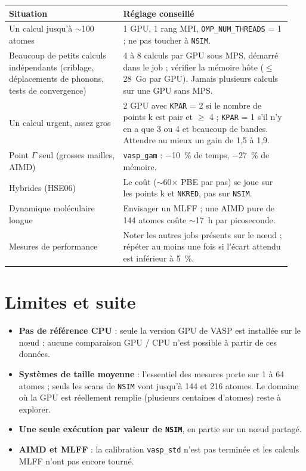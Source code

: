 \documentclass[11pt,a4paper]{article}
\begin{document}
\begin{center}
\small
\begin{tabular}{@{}p{0.38\linewidth}p{0.56\linewidth}@{}}
\toprule
Situation & Réglage conseillé \\
\midrule
Un calcul jusqu'à $\sim$100 atomes & 1 GPU, 1 rang MPI, \texttt{OMP\_NUM\_THREADS} = 1 ;
ne pas toucher à \texttt{NSIM}. \\
\addlinespace
Beaucoup de petits calculs indépendants (criblage, déplacements de phonons, tests de
convergence) & 4 à 8 calculs par GPU sous MPS, démarré dans le job ; vérifier la mémoire hôte
($\leq$ \SI{28}{Go} par GPU). Jamais plusieurs calculs sur une GPU sans MPS. \\
\addlinespace
Un calcul urgent, assez gros & 2 GPU avec \texttt{KPAR} = 2 si le nombre de points k est
pair et $\geq$ 4 ; \texttt{KPAR} = 1 s'il n'y en a que 3 ou 4 et beaucoup de bandes.
Attendre au mieux un gain de 1,5 à 1,9. \\
\addlinespace
Point $\Gamma$ seul (grosses mailles, AIMD) & \texttt{vasp\_gam} : $-$\SI{10}{\percent} de
temps, $-$\SI{27}{\percent} de mémoire. \\
\addlinespace
Hybrides (HSE06) & Le coût ($\sim$60$\times$ PBE par pas) se joue sur les points k et
\texttt{NKRED}, pas sur \texttt{NSIM}. \\
\addlinespace
Dynamique moléculaire longue & Envisager un MLFF ; une AIMD pure de 144 atomes coûte
$\sim$\SI{17}{h} par picoseconde. \\
\addlinespace
Mesures de performance & Noter les autres jobs présents sur le nœud ; répéter au moins une
fois si l'écart attendu est inférieur à \SI{5}{\percent}. \\
\bottomrule
\end{tabular}
\end{center}

\section{Limites et suite}
\label{sec:limites}

\begin{itemize}
  \item \textbf{Pas de référence CPU} : seule la version GPU de VASP est installée sur le nœud ;
        aucune comparaison GPU / CPU n'est possible à partir de ces données.
  \item \textbf{Systèmes de taille moyenne} : l'essentiel des mesures porte sur 1 à 64 atomes ;
        seuls les scans de \texttt{NSIM} vont jusqu'à 144 et 216 atomes. Le domaine où la GPU
        est réellement remplie (plusieurs centaines d'atomes) reste à explorer.
  \item \textbf{Une seule exécution par valeur de \texttt{NSIM}}, en partie sur un nœud partagé.
  \item \textbf{AIMD et MLFF} : la calibration \texttt{vasp\_std} n'est pas terminée et les
        calculs MLFF n'ont pas encore tourné.
\end{itemize}
\end{document}
